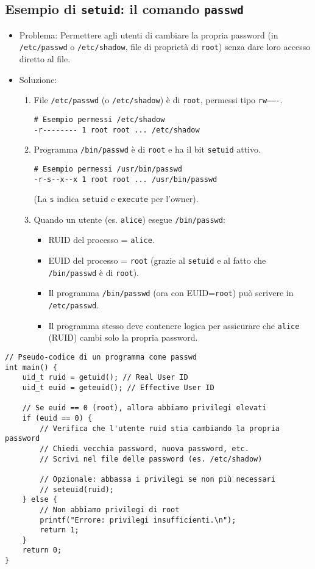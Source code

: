 \documentclass{article}
\begin{document}
\subsection{Esempio di \texttt{setuid}: il comando \texttt{passwd}}
\begin{itemize}
    \item Problema: Permettere agli utenti di cambiare la propria password (in \texttt{/etc/passwd} o \texttt{/etc/shadow}, file di proprietà di \texttt{root}) senza dare loro accesso diretto al file.
    \item Soluzione:
    \begin{enumerate}
        \item File \texttt{/etc/passwd} (o \texttt{/etc/shadow}) è di \texttt{root}, permessi tipo \texttt{rw-------}.
        \begin{verbatim}
# Esempio permessi /etc/shadow
-r-------- 1 root root ... /etc/shadow
        \end{verbatim}
        \item Programma \texttt{/bin/passwd} è di \texttt{root} e ha il bit \texttt{setuid} attivo.
        \begin{verbatim}
# Esempio permessi /usr/bin/passwd
-r-s--x--x 1 root root ... /usr/bin/passwd
        \end{verbatim}
        (La \texttt{s} indica \texttt{setuid} e \texttt{execute} per l'owner).
        \item Quando un utente (es. \texttt{alice}) esegue \texttt{/bin/passwd}:
        \begin{itemize}
            \item RUID del processo = \texttt{alice}.
            \item EUID del processo = \texttt{root} (grazie al \texttt{setuid} e al fatto che \texttt{/bin/passwd} è di \texttt{root}).
            \item Il programma \texttt{/bin/passwd} (ora con EUID=\texttt{root}) può scrivere in \texttt{/etc/passwd}.
            \item Il programma stesso deve contenere logica per assicurare che \texttt{alice} (RUID) cambi solo la propria password.
        \end{itemize}
    \end{enumerate}
\end{itemize}
\begin{verbatim}
// Pseudo-codice di un programma come passwd
int main() {
    uid_t ruid = getuid(); // Real User ID
    uid_t euid = geteuid(); // Effective User ID

    // Se euid == 0 (root), allora abbiamo privilegi elevati
    if (euid == 0) {
        // Verifica che l'utente ruid stia cambiando la propria password
        // Chiedi vecchia password, nuova password, etc.
        // Scrivi nel file delle password (es. /etc/shadow)
        
        // Opzionale: abbassa i privilegi se non più necessari
        // seteuid(ruid); 
    } else {
        // Non abbiamo privilegi di root
        printf("Errore: privilegi insufficienti.\n");
        return 1;
    }
    return 0;
}
\end{verbatim}
\end{document}
